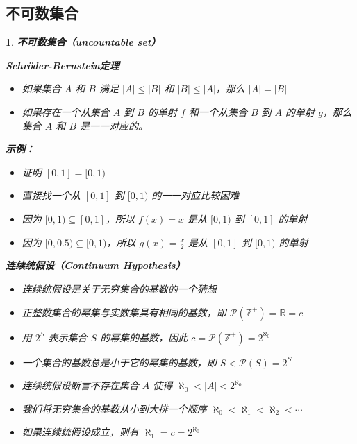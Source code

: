 \documentclass[UTF8]{report}
\theoremstyle{MyLineTheoremStyle} %
\theoremstyle{MyBlockTheoremStyle} %
\theoremstyle{MySubsubsectionStyle} %
\newtheorem{definition}{}
\begin{document}
\subsection{不可数集合}

\begin{definition}
    \textbf{不可数集合（uncountable set）}\par
    \textbf{Schröder-Bernstein定理}\par
    \begin{itemize}
        \item 如果集合 $A$ 和 $B$ 满足 $|A| \leq |B|$ 和 $|B| \leq |A|$，那么 $|A| = |B|$
        \item 如果存在一个从集合 $A$ 到 $B$ 的单射 $f$ 和一个从集合 $B$ 到 $A$ 的单射 $g$，那么集合 $A$ 和 $B$ 是一一对应的。
    \end{itemize}

    \textbf{示例：}\par
    \begin{itemize}
        \item 证明 $[0,1] = [0,1)$
        \item 直接找一个从 $[0,1]$ 到 $[0,1)$ 的一一对应比较困难
        \item 因为 $[0,1) \subseteq [0,1]$，所以 $f(x) = x$ 是从 $[0,1)$ 到 $[0,1]$ 的单射
        \item 因为 $[0,0.5) \subseteq [0,1)$，所以 $g(x) = \frac{x}{2}$ 是从 $[0,1]$ 到 $[0,1)$ 的单射
    \end{itemize}

    \textbf{连续统假设（Continuum Hypothesis）}\par
    \begin{itemize}
        \item 连续统假设是关于无穷集合的基数的一个猜想
        \item 正整数集合的幂集与实数集具有相同的基数，即 $\mathcal{P}(\mathbb{Z}^+) = \mathbb{R} = c$
        \item 用 $2^S$ 表示集合 $S$ 的幂集的基数，因此 $c = \mathcal{P}(\mathbb{Z}^+) = 2^{\aleph_0}$
        \item 一个集合的基数总是小于它的幂集的基数，即 $S < \mathcal{P}(S) = 2^S$
        \item 连续统假设断言不存在集合 $A$ 使得 $\aleph_0 < |A| < 2^{\aleph_0}$
        \item 我们将无穷集合的基数从小到大排一个顺序 $\aleph_0 < \aleph_1 < \aleph_2 < \cdots$
        \item 如果连续统假设成立，则有 $\aleph_1 = c = 2^{\aleph_0}$
    \end{itemize}
\end{definition}
\end{document}
